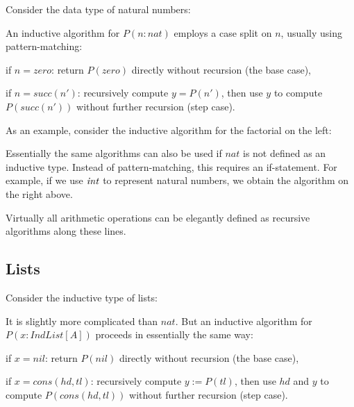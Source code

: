 Consider the data type of natural numbers:
\begin{acode}
\end{acode}

An inductive algorithm for $P(n:nat)$ employs a case split on $n$, usually using pattern-matching:
\begin{compactitem}
 \item if $n=zero$: return $P(zero)$ directly without recursion (the base case),
 \item if $n=succ(n')$: recursively compute $y=P(n')$, then use $y$ to compute $P(succ(n'))$ without further recursion (step case).
\end{compactitem}

As an example, consider the inductive algorithm for the factorial on the left:
\newpage
\begin{multicols}{2}
\begin{acode}
\end{acode}
\columnbreak
\begin{acode}
\end{acode}
\end{multicols}

Essentially the same algorithms can also be used if $nat$ is not defined as an inductive type.
Instead of pattern-matching, this requires an if-statement.
For example, if we use $\mathit{int}$ to represent natural numbers, we obtain the algorithm on the right above.
\medskip

Virtually all arithmetic operations can be elegantly defined as recursive algorithms along these lines.

\subsection{Lists}

Consider the inductive type of lists:
\begin{acode}
\end{acode}

It is slightly more complicated than $nat$.
But an inductive algorithm for $P(x:IndList[A])$ proceeds in essentially the same way:
\begin{compactitem}
 \item if $x=nil$: return $P(nil)$ directly without recursion (the base case),
 \item if $x=cons(hd,tl)$: recursively compute $y:=P(tl)$, then use $hd$ and $y$ to compute $P(cons(hd,tl))$ without further recursion (step case).
\end{compactitem}

